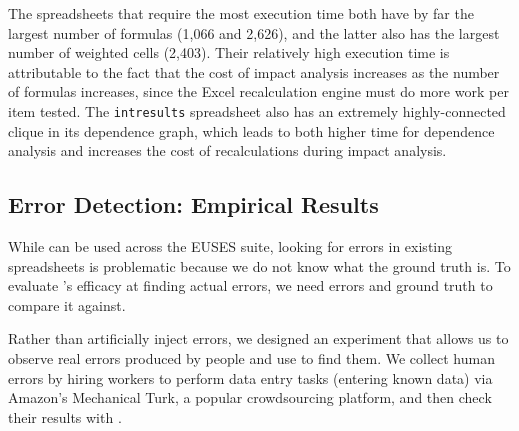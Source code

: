 The spreadsheets that require the most execution time both have by far
the largest number of formulas (1,066 and 2,626), and the latter also
has the largest number of weighted cells (2,403). Their relatively
high execution time is attributable to the fact that the cost of impact
analysis increases as the number of formulas increases, since the
Excel recalculation engine must do more work per item tested. The
\texttt{intresults} spreadsheet also has an extremely highly-connected
clique in its dependence graph, which leads to both higher time for
dependence analysis and increases the cost of recalculations during
impact analysis. %






\subsection{Error Detection: Empirical Results}
\label{sec:user_study}

While \checkcell{} can be used across the EUSES suite, looking for
errors in existing spreadsheets is problematic because we do not know
what the ground truth is. To evaluate \checkcell{}'s efficacy at
finding actual errors, we need errors and ground truth to compare it
against.

Rather than artificially inject errors, we designed an experiment that
allows us to observe real errors produced by people and use
\checkcell{} to find them. We collect human errors by hiring workers
to perform data entry tasks (entering known data) via Amazon's
Mechanical Turk, a popular crowdsourcing platform, and then check
their results with \checkcell{}.

